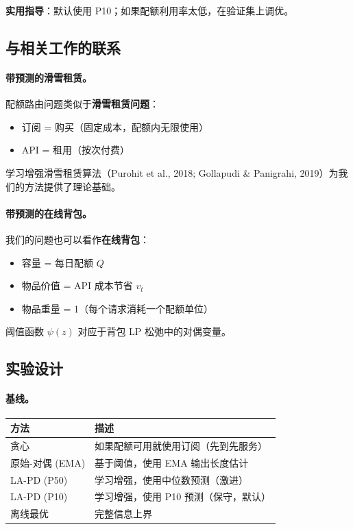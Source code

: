 \documentclass[11pt]{article}
\begin{document}
\textbf{实用指导}：默认使用 P10；如果配额利用率太低，在验证集上调优。

\subsection{与相关工作的联系}

\paragraph{带预测的滑雪租赁。}
配额路由问题类似于\textbf{滑雪租赁问题}：
\begin{itemize}
  \item 订阅 = 购买（固定成本，配额内无限使用）
  \item API = 租用（按次付费）
\end{itemize}

学习增强滑雪租赁算法（Purohit et al., 2018; Gollapudi \& Panigrahi, 2019）为我们的方法提供了理论基础。

\paragraph{带预测的在线背包。}
我们的问题也可以看作\textbf{在线背包}：
\begin{itemize}
  \item 容量 = 每日配额 $Q$
  \item 物品价值 = API 成本节省 $v_t$
  \item 物品重量 = 1（每个请求消耗一个配额单位）
\end{itemize}

阈值函数 $\psi(z)$ 对应于背包 LP 松弛中的对偶变量。

\subsection{实验设计}

\paragraph{基线。}
\begin{center}
\begin{tabular}{|l|l|}
\hline
\textbf{方法} & \textbf{描述} \\
\hline
贪心 & 如果配额可用就使用订阅（先到先服务）\\
原始-对偶 (EMA) & 基于阈值，使用 EMA 输出长度估计 \\
LA-PD (P50) & 学习增强，使用中位数预测（激进）\\
LA-PD (P10) & 学习增强，使用 P10 预测（保守，默认）\\
离线最优 & 完整信息上界 \\
\hline
\end{tabular}
\end{center}
\end{document}
